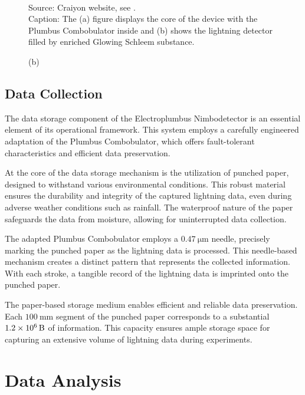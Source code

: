 \documentclass[english]{cenarticle}
\begin{document}
\begin{figure}[!h]
\begin{center}
\begin{minipage}[t]{\x\linewidth}
      \captionsetup{justification=centering, font=footnotesize}
			\caption*{(b)}\label{fig:triangle2b}
		\end{minipage}\\
  \end{center}%
  \vspace{-1mm}
  {\footnotesize
  Source: Craiyon website, see \citep{Craiyon}.\\
  Caption: The (a) figure displays the core of the device with the Plumbus Combobulator inside and (b) shows the lightning detector filled by enriched Glowing Schleem substance.\\
  }
	\label{fig:triangle2}
  \end{figure}\vspace{-9mm}
%
\subsection{Data Collection}

The data storage component of the Electroplumbus Nimbodetector is an essential element of its operational framework. This system employs a carefully engineered adaptation of the Plumbus Combobulator, which offers fault-tolerant characteristics and efficient data preservation.

At the core of the data storage mechanism is the utilization of punched paper, designed to withstand various environmental conditions. This robust material ensures the durability and integrity of the captured lightning data, even during adverse weather conditions such as rainfall. The waterproof nature of the paper safeguards the data from moisture, allowing for uninterrupted data collection.

The adapted Plumbus Combobulator employs a $\SI{0.47}{\micro\meter}$ needle, precisely marking the punched paper as the lightning data is processed. This needle-based mechanism creates a distinct pattern that represents the collected information. With each stroke, a tangible record of the lightning data is imprinted onto the punched paper.

The paper-based storage medium enables efficient and reliable data preservation. Each $\SI{100}{\milli\meter}$ segment of the punched paper corresponds to a substantial $\SI{1.2E6}{\byte}$ of information. This capacity ensures ample storage space for capturing an extensive volume of lightning data during experiments.

\section{Data Analysis}
\end{document}
